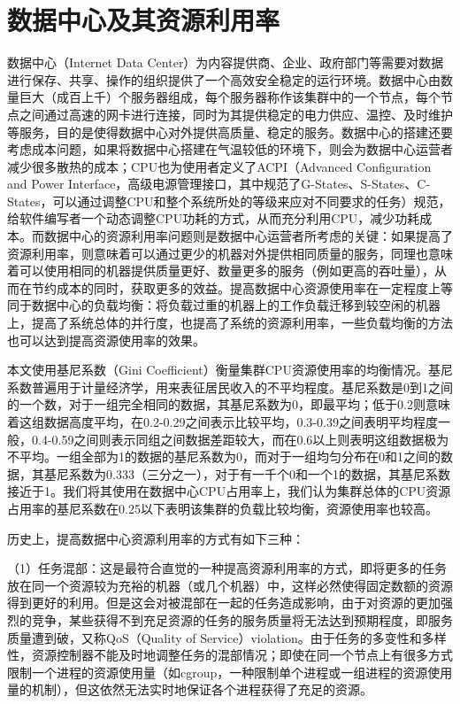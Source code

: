 \section{数据中心及其资源利用率}
数据中心（Internet Data Center）为内容提供商、企业、政府部门等需要对数据进行保存、共享、操作的组织提供了一个高效安全稳定的运行环境。数据中心由数量巨大（成百上千）个服务器组成，每个服务器称作该集群中的一个节点，每个节点之间通过高速的网卡进行连接，同时为其提供稳定的电力供应、温控、及时维护等服务，目的是使得数据中心对外提供高质量、稳定的服务。数据中心的搭建还要考虑成本问题，如果将数据中心搭建在气温较低的环境下，则会为数据中心运营者减少很多散热的成本；CPU也为使用者定义了ACPI（Advanced Configuration and Power Interface，高级电源管理接口，其中规范了G-States、S-States、C-States，可以通过调整CPU和整个系统所处的等级来应对不同要求的任务）规范，给软件编写者一个动态调整CPU功耗的方式，从而充分利用CPU，减少功耗成本。而数据中心的资源利用率问题则是数据中心运营者所考虑的关键：如果提高了资源利用率，则意味着可以通过更少的机器对外提供相同质量的服务，同理也意味着可以使用相同的机器提供质量更好、数量更多的服务（例如更高的吞吐量），从而在节约成本的同时，获取更多的效益。提高数据中心资源使用率在一定程度上等同于数据中心的负载均衡：将负载过重的机器上的工作负载迁移到较空闲的机器上，提高了系统总体的并行度，也提高了系统的资源利用率，一些负载均衡的方法也可以达到提高资源使用率的效果。

本文使用基尼系数（Gini Coefficient）\cite{gini}衡量集群CPU资源使用率的均衡情况。基尼系数普遍用于计量经济学，用来表征居民收入的不平均程度。基尼系数是0到1之间的一个数，对于一组完全相同的数据，其基尼系数为0，即最平均；低于0.2则意味着这组数据高度平均，在0.2-0.29之间表示比较平均，0.3-0.39之间表明平均程度一般，0.4-0.59之间则表示同组之间数据差距较大，而在0.6以上则表明这组数据极为不平均。一组全部为1的数据的基尼系数为0，而对于一组均匀分布在0和1之间的数据，其基尼系数为0.333（三分之一），对于有一千个0和一个1的数据，其基尼系数接近于1。我们将其使用在数据中心CPU占用率上，我们认为集群总体的CPU资源占用率的基尼系数在0.25以下表明该集群的负载比较均衡，资源使用率也较高。

历史上，提高数据中心资源利用率的方式有如下三种：

（1）任务混部：这是最符合直觉的一种提高资源利用率的方式，即将更多的任务放在同一个资源较为充裕的机器（或几个机器）中，这样必然使得固定数额的资源得到更好的利用。但是这会对被混部在一起的任务造成影响，由于对资源的更加强烈的竞争，某些获得不到充足资源的任务的服务质量将无法达到预期程度，即服务质量遭到破，又称QoS（Quality of Service）violation。由于任务的多变性和多样性，资源控制器不能及时地调整任务的混部情况；即使在同一个节点上有很多方式限制一个进程的资源使用量（如cgroup，一种限制单个进程或一组进程的资源使用量的机制），但这依然无法实时地保证各个进程获得了充足的资源。

